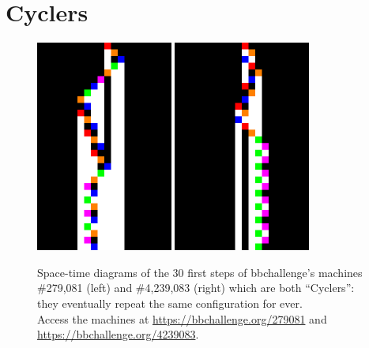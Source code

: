 
\newpage
\section{Cyclers}\label{sec:cyclers}

\begin{figure}[h!]
  \centering
  \includegraphics[width=0.4\textwidth]{figures/space-time-diagrams/cycler_279081.pdf}
  \hspace{2ex}
  \includegraphics[width=0.4\textwidth]{figures/space-time-diagrams/cycler_4239083.pdf}
  \caption{Space-time diagrams of the 30 first steps of bbchallenge's machines \#279,081 (left) and \#4,239,083 (right) which are both ``Cyclers'': they eventually repeat the same configuration for ever. \\
    Access the machines at \url{https://bbchallenge.org/279081} and
    \url{https://bbchallenge.org/4239083}.}\label{fig:cyclers}
\end{figure}

